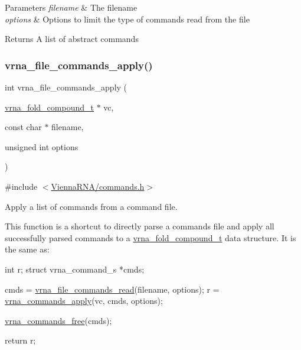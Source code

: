 \begin{DoxyParams}{Parameters}
{\em filename} & The filename \\
\hline
{\em options} & Options to limit the type of commands read from the file \\
\hline
\end{DoxyParams}
\begin{DoxyReturn}{Returns}
A list of abstract commands 
\end{DoxyReturn}
\mbox{\label{group__command__files_gadbe8c9622f7bcc6dcbe3448b98df8656}} 
\subsubsection{\texorpdfstring{vrna\+\_\+file\+\_\+commands\+\_\+apply()}{vrna\_file\_commands\_apply()}}
{\footnotesize\ttfamily int vrna\+\_\+file\+\_\+commands\+\_\+apply (\begin{DoxyParamCaption}\item[{\hyperlink{group__fold__compound_ga1b0cef17fd40466cef5968eaeeff6166}{vrna\+\_\+fold\+\_\+compound\+\_\+t} $\ast$}]{vc,  }\item[{const char $\ast$}]{filename,  }\item[{unsigned int}]{options }\end{DoxyParamCaption})}



{\ttfamily \#include $<$\hyperlink{commands_8h}{Vienna\+R\+N\+A/commands.\+h}$>$}



Apply a list of commands from a command file. 

This function is a shortcut to directly parse a commands file and apply all successfully parsed commands to a \hyperlink{group__fold__compound_ga1b0cef17fd40466cef5968eaeeff6166}{vrna\+\_\+fold\+\_\+compound\+\_\+t} data structure. It is the same as\+: 
\begin{DoxyCodeInclude}
  \textcolor{keywordtype}{int}                   r;
  \textcolor{keyword}{struct }vrna\_command\_s *cmds;

  cmds  = \hyperlink{group__command__files_gae5f56400ed43683338f7bf1c1102655a}{vrna\_file\_commands\_read}(filename, options);
  r     = \hyperlink{group__command__files_gac65d0fe86f7671a2d2b85dda1a3ddc16}{vrna\_commands\_apply}(vc, cmds, options);

  \hyperlink{group__command__files_ga3dc372dcbb43d2c4c91b5ef79b460428}{vrna\_commands\_free}(cmds);

  \textcolor{keywordflow}{return} r;
\end{DoxyCodeInclude}
 
